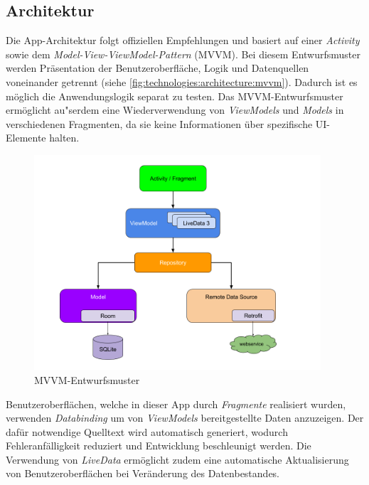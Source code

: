 \documentclass[a4paper]{article}
\begin{document}
\subsection{Architektur}
\label{subsec:technologies:architecture}
Die App-Architektur folgt offiziellen Empfehlungen \autocite{google_recommendations} und basiert auf einer \textit{Activity} sowie dem \textit{Model-View-ViewModel-Pattern} (MVVM).
Bei diesem Entwurfsmuster werden Präsentation der Benutzeroberfläche, Logik und Datenquellen voneinander getrennt (siehe \autoref{fig:technologies:architecture:mvvm}).
Dadurch ist es möglich die Anwendungslogik separat zu testen.
Das MVVM-Entwurfsmuster ermöglicht au"serdem eine Wiederverwendung von \textit{ViewModels} und \textit{Models} in verschiedenen Fragmenten, da sie keine Informationen über spezifische UI-Elemente halten.

\begin{figure}[H]
	\centering
	\includegraphics[height=8cm,keepaspectratio]{./images/mvvm-architecture.png}
	\caption{MVVM-Entwurfsmuster \autocite{mvvm_architecture}}
	\label{fig:technologies:architecture:mvvm}
\end{figure}

Benutzeroberflächen, welche in dieser App durch \textit{Fragmente} realisiert wurden, verwenden \textit{Databinding} um von \textit{ViewModels} bereitgestellte Daten anzuzeigen.
Der dafür notwendige Quelltext wird automatisch generiert, wodurch Fehleranfälligkeit reduziert und Entwicklung beschleunigt werden.
Die Verwendung von \textit{LiveData} ermöglicht zudem eine automatische Aktualisierung von Benutzeroberflächen bei Veränderung des Datenbestandes.
\end{document}
